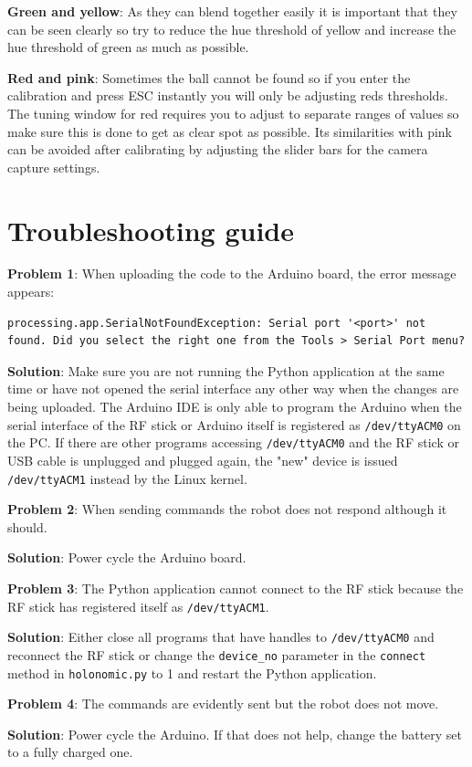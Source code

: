 \documentclass[a4paper,12pt]{article}
\begin{document}
\textbf{Green and yellow}: As they can blend together easily it is important that they can be seen clearly so try to reduce the hue threshold of yellow and increase the hue threshold of green as much as possible. 

\textbf{Red and pink}: Sometimes the ball cannot be found so if you enter the calibration and press ESC instantly you will only be adjusting reds thresholds. The tuning window for red requires you to adjust to separate ranges of values so make sure this is done to get as clear spot as possible.  Its similarities with pink can be avoided after calibrating by adjusting the slider bars for the camera capture settings.

\section{Troubleshooting guide}

\textbf{Problem 1}: When uploading the code to the Arduino board, the error message appears:
\begin{lstlisting}
processing.app.SerialNotFoundException: Serial port '<port>' not found. Did you select the right one from the Tools > Serial Port menu?
\end{lstlisting}
\textbf{Solution}: Make sure you are not running the Python application at the same time or have not opened the serial interface any other way when the changes are being uploaded. The Arduino IDE is only able to program the Arduino when the serial interface of the RF stick or Arduino itself is registered as \texttt{/dev/ttyACM0} on the PC. If there are other programs accessing \texttt{/dev/ttyACM0} and the RF stick or USB cable is unplugged and plugged again, the "new" device is issued \texttt{/dev/ttyACM1} instead by the Linux kernel.

\textbf{Problem 2}: When sending commands the robot does not respond although it should.

\textbf{Solution}: Power cycle the Arduino board.

\textbf{Problem 3}: The Python application cannot connect to the RF stick because the RF stick has registered itself as \texttt{/dev/ttyACM1}.

\textbf{Solution}: Either close all programs that have handles to \texttt{/dev/ttyACM0} and reconnect the RF stick or change the \texttt{device\_no} parameter in the \texttt{connect} method in \texttt{holonomic.py} to 1 and restart the Python application.

\textbf{Problem 4}: The commands are evidently sent but the robot does not move.

\textbf{Solution}: Power cycle the Arduino. If that does not help, change the battery set to a fully charged one.
\end{document}
